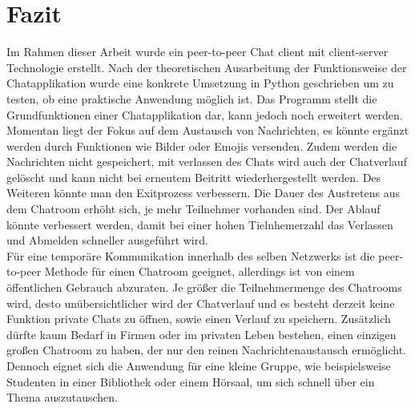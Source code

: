 \section{Fazit}
Im Rahmen dieser Arbeit wurde ein peer-to-peer Chat client mit client-server Technologie erstellt. 
Nach der theoretischen Ausarbeitung der Funktionsweise der Chatapplikation wurde eine konkrete Umsetzung in Python geschrieben um zu testen,
ob eine praktische Anwendung möglich ist.
Das Programm stellt die Grundfunktionen einer Chatapplikation dar, kann jedoch noch erweitert werden. 
Momentan liegt der Fokus auf dem Austausch von Nachrichten, es könnte ergänzt werden durch Funktionen wie Bilder oder Emojis versenden. Zudem werden
die Nachrichten nicht gespeichert, mit verlassen des Chats wird auch der Chatverlauf gelöscht und kann nicht bei erneutem Beitritt wiederhergestellt werden.
Des Weiteren könnte man den Exitprozess verbessern. Die Dauer des Austretens aus dem Chatroom erhöht sich, je mehr Teilnehmer vorhanden sind.
Der Ablauf könnte verbessert werden, damit bei einer hohen Tielnhemerzahl das Verlassen und Abmelden schneller ausgeführt wird.
\\
Für eine temporäre Kommunikation innerhalb des selben Netzwerks ist die peer-to-peer Methode für einen Chatroom geeignet, allerdings ist von einem 
öffentlichen Gebrauch abzuraten. Je größer die Teilnehmermenge des Chatrooms wird, desto unübersichtlicher wird der Chatverlauf und es besteht derzeit keine 
Funktion private Chats zu öffnen, sowie einen Verlauf zu speichern.
Zusätzlich dürfte kaum Bedarf in Firmen oder im privaten Leben bestehen, einen einzigen großen Chatroom zu haben, der nur den reinen Nachrichtenaustausch ermöglicht.
Dennoch eignet sich die Anwendung für eine kleine Gruppe, wie beispielsweise Studenten in einer Bibliothek oder einem Hörsaal, um sich schnell über ein Thema auszutauschen.

